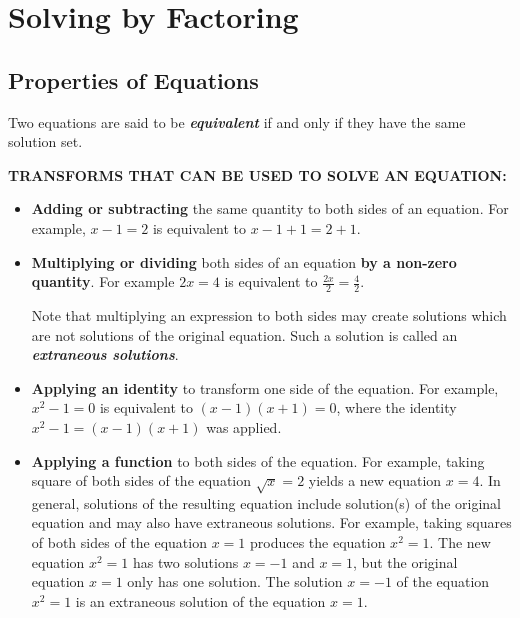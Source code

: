 
\hypertarget{solving-polynomial-equations-by-factoring}{%
\section{Solving by
Factoring}\label{solving-by-factoring}}

\hypertarget{properties-of-equations}{%
\subsection{Properties of Equations}\label{properties-of-equations}}

Two equations are said to be
\textbf{\emph{equivalent}} if and only if they have the same solution
set.

\noindent
\textbf{\MakeUppercase{Transforms that can be used to solve an equation}:}

\begin{itemize}
\item
  \textbf{Adding or subtracting} the same quantity to both sides of an equation.
  For example, \(x-1=2\) is equivalent to \(x-1+1=2+1\).
\item
  \textbf{Multiplying or dividing} both sides of an equation \textbf{by a
  non-zero quantity}. For example \(2x=4\) is equivalent to
  \(\frac{2x}{2}=\frac{4}{2}\).
  
  Note that multiplying an expression to both sides may create solutions which are not solutions of the original equation. Such a solution is called an \textbf{\emph{extraneous solutions}}.
\item
  \textbf{Applying an identity} to transform one side of the equation. For
  example, \(x^2-1=0\) is equivalent to \((x-1)(x+1)=0\), where the
  identity \(x^2-1=(x-1)(x+1)\) was applied.

\item \textbf{Applying a function} to both sides of the equation. For example, taking square of both sides of the equation $\sqrt{x}=2$ yields a new equation $x=4$. In general, solutions of the resulting equation include solution(s) of the original equation and may also have extraneous solutions. For example, taking squares of both sides of the equation \(x=1\) produces the equation \(x^2=1\). The
new equation \(x^2=1\) has two solutions \(x=-1\) and \(x=1\), but the
original equation \(x=1\) only has one solution. The solution \(x=-1\)
of the equation \(x^2=1\) is an extraneous solution of the equation
\(x=1\).
\end{itemize}


